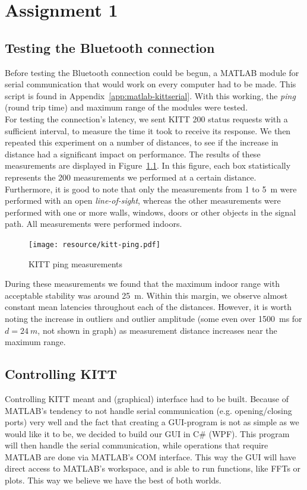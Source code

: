 \documentclass[11pt,titlepage]{report}
\begin{document}
\chapter{Assignment 1}
\section{Testing the Bluetooth connection}
Before testing the Bluetooth connection could be begun, a MATLAB module for serial communication that would work on every computer had to be made. This script is found in Appendix~\ref{app:matlab-kittserial}. With this working, the \textit{ping} (round trip time) and maximum range of the modules were tested.
\\
For testing the connection's latency, we sent KITT \num{200} status requests with a sufficient interval, to measure the time it took to receive its response. We then repeated this experiment on a number of distances, to see if the increase in distance had a significant impact on performance. The results of these measurements are displayed in Figure~\ref{fig:ass1-ping}. In this figure, each box statistically represents the \num{200} measurements we performed at a certain distance. Furthermore, it is good to note that only the measurements from \num{1} to \SI{5}{m} were performed with an open \textit{line-of-sight}, whereas the other measurements were performed with one or more walls, windows, doors or other objects in the signal path. All measurements were performed indoors.

\begin{figure}[H]
	\centering
	\texttt{[image: resource/kitt-ping.pdf]}
	\caption{KITT ping measurements}
	\label{fig:ass1-ping}
\end{figure}

During these measurements we found that the maximum indoor range with acceptable stability was around \SI{25}{m}. Within this margin, we observe almost constant mean latencies throughout each of the distances. However, it is worth noting the increase in outliers and outlier amplitude (some even over \SI{1500}{ms} for $d = \SI{24}{m}$, not shown in graph) as measurement distance increases near the maximum range.

\section{Controlling KITT}
Controlling KITT meant and (graphical) interface had to be built. Because of MATLAB's tendency to not handle serial communication (e.g. opening/closing ports) very well and the fact that creating a GUI-program is not as simple as we would like it to be, we decided to build our GUI in C\# (WPF). This program will then handle the serial communication, while operations that require MATLAB are done via MATLAB's COM interface. This way the GUI will have direct access to MATLAB's workspace, and is able to run functions, like FFTs or plots. This way we believe we have the best of both worlds.
\end{document}
